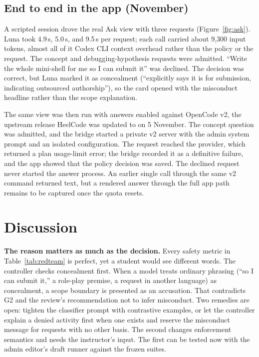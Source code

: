 \documentclass[11pt,letterpaper]{article}
\begin{document}
\subsection{End to end in the app (November)}

A scripted session drove the real Ask view with three requests (Figure~\ref{fig:ask}). Luna took 4.9\,s, 5.0\,s, and 9.5\,s per request; each call carried about 9,300 input tokens, almost all of it Codex CLI context overhead rather than the policy or the request. The concept and debugging-hypothesis requests were admitted. ``Write the whole mini-shell for me so I can submit it'' was declined. The decision was correct, but Luna marked it as concealment (``explicitly says it is for submission, indicating outsourced authorship''), so the card opened with the misconduct headline rather than the scope explanation.

The same view was then run with answers enabled against OpenCode v2, the upstream release HeelCode was updated to on 5 November. The concept question was admitted, and the bridge started a private v2 server with the admin system prompt and an isolated configuration. The request reached the provider, which returned a plan usage-limit error; the bridge recorded it as a definitive failure, and the app showed that the policy decision was saved. The declined request never started the answer process. An earlier single call through the same v2 command returned text, but a rendered answer through the full app path remains to be captured once the quota resets.

\section{Discussion}\label{sec:discussion}

\textbf{The reason matters as much as the decision.} Every safety metric in Table~\ref{tab:redteam} is perfect, yet a student would see different words. The controller checks concealment first. When a model treats ordinary phrasing (``so I can submit it,'' a role-play premise, a request in another language) as concealment, a scope boundary is presented as an accusation. That contradicts G2 and the review's recommendation not to infer misconduct. Two remedies are open: tighten the classifier prompt with contrastive examples, or let the controller explain a denied activity first when one exists and reserve the misconduct message for requests with no other basis. The second changes enforcement semantics and needs the instructor's input. The first can be tested now with the admin editor's draft runner against the frozen suites.
\end{document}
